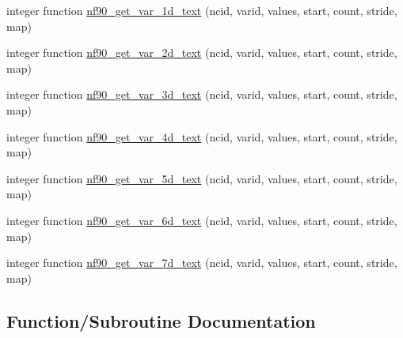 \begin{DoxyCompactItemize}
\item 
integer function \hyperlink{netcdf__text__variables_8f90_a263170f14221147b1c729de049e43cab}{nf90\+\_\+get\+\_\+var\+\_\+1d\+\_\+text} (ncid, varid, values, start, count, stride, map)
\item 
integer function \hyperlink{netcdf__text__variables_8f90_a89e4c64b6b65d29cfa998387d381452c}{nf90\+\_\+get\+\_\+var\+\_\+2d\+\_\+text} (ncid, varid, values, start, count, stride, map)
\item 
integer function \hyperlink{netcdf__text__variables_8f90_ac1af6b101c3f3b575dc171548abed217}{nf90\+\_\+get\+\_\+var\+\_\+3d\+\_\+text} (ncid, varid, values, start, count, stride, map)
\item 
integer function \hyperlink{netcdf__text__variables_8f90_ac969f9a8af11404d2568b7431e6a175d}{nf90\+\_\+get\+\_\+var\+\_\+4d\+\_\+text} (ncid, varid, values, start, count, stride, map)
\item 
integer function \hyperlink{netcdf__text__variables_8f90_a2a34081d2ab49f288ff045399e59e0e3}{nf90\+\_\+get\+\_\+var\+\_\+5d\+\_\+text} (ncid, varid, values, start, count, stride, map)
\item 
integer function \hyperlink{netcdf__text__variables_8f90_aa66c41c62185789bb5e8994a5370c57f}{nf90\+\_\+get\+\_\+var\+\_\+6d\+\_\+text} (ncid, varid, values, start, count, stride, map)
\item 
integer function \hyperlink{netcdf__text__variables_8f90_a0f635c51a727d97eb7edf3784159ff5c}{nf90\+\_\+get\+\_\+var\+\_\+7d\+\_\+text} (ncid, varid, values, start, count, stride, map)
\end{DoxyCompactItemize}


\subsection{Function/\+Subroutine Documentation}
\mbox{\label{netcdf__text__variables_8f90_a263170f14221147b1c729de049e43cab}} 
